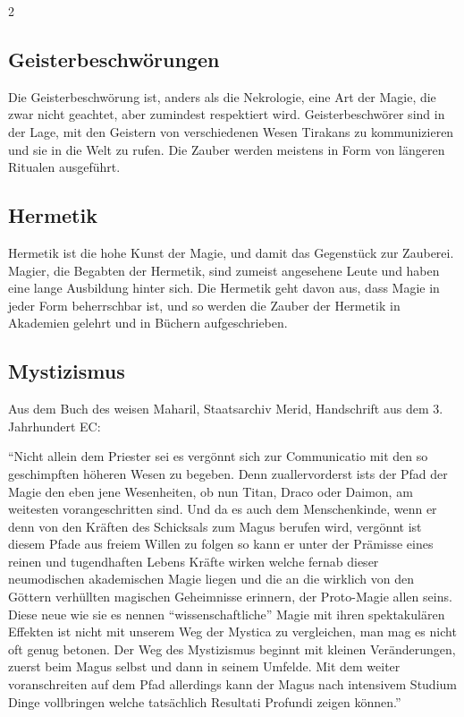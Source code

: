 \begin{multicols*}{2}
\subsection{Geisterbeschwörungen}\label{subsec:geisterbeschworungen}

Die Geisterbeschwörung ist, anders als die Nekrologie, eine Art der Magie, die zwar nicht geachtet, aber zumindest respektiert wird.
Geisterbeschwörer sind in der Lage, mit den Geistern von verschiedenen Wesen Tirakans zu kommunizieren und sie in die Welt zu rufen.
Die Zauber werden meistens in Form von längeren Ritualen ausgeführt.

\subsection{Hermetik}\label{subsec:hermetik}

Hermetik ist die hohe Kunst der Magie, und damit das Gegenstück zur Zauberei.
Magier, die Begabten der Hermetik, sind zumeist angesehene Leute und haben eine lange Ausbildung hinter sich.
Die Hermetik geht davon aus, dass Magie in jeder Form beherrschbar ist, und so werden die Zauber der Hermetik in Akademien gelehrt und in Büchern aufgeschrieben.


\subsection{Mystizismus}
Aus dem Buch des weisen Maharil, Staatsarchiv Merid, Handschrift aus dem 3. Jahrhundert EC:

``Nicht allein dem Priester sei es vergönnt sich zur Communicatio mit den so geschimpften höheren Wesen zu begeben.
Denn zuallervorderst ists der Pfad der Magie den eben jene Wesenheiten, ob nun Titan, Draco oder Daimon, am weitesten vorangeschritten sind.
Und da es auch dem Menschenkinde, wenn er denn von den Kräften des Schicksals zum Magus berufen wird, vergönnt ist diesem Pfade aus freiem Willen zu folgen so kann er unter der Prämisse eines reinen und tugendhaften Lebens Kräfte wirken welche fernab dieser neumodischen akademischen Magie liegen und die an die wirklich von den Göttern verhüllten magischen Geheimnisse erinnern, der Proto-Magie allen seins.
Diese neue wie sie es nennen “wissenschaftliche” Magie mit ihren spektakulären Effekten ist nicht mit unserem Weg der Mystica zu vergleichen, man mag es nicht oft genug betonen.
Der Weg des Mystizismus beginnt mit kleinen Veränderungen, zuerst beim Magus selbst und dann in seinem Umfelde.
Mit dem weiter voranschreiten auf dem Pfad allerdings kann der Magus nach intensivem Studium Dinge vollbringen welche tatsächlich Resultati Profundi zeigen können.''


\end{multicols*}
